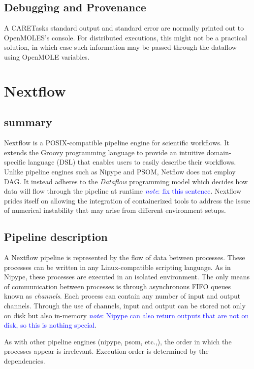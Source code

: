 \documentclass{report}
\newcommand{\note}[1]{\textcolor{blue}{\textit{note}: #1}}
\begin{document}
        \subsection{Debugging and Provenance} A CARETasks standard output and
        standard error are normally printed out to OpenMOLES's console. For
        distributed executions, this might not be a practical solution, in which
        case such information may be passed through the dataflow using OpenMOLE
        variables.
         
        \section{Nextflow} \subsection{summary} Nextflow is a POSIX-compatible
        pipeline engine for scientific workflows.  It extends the Groovy
        programming language to provide an  intuitive domain-specific language
        (DSL) that enables users to easily describe their workflows. Unlike
        pipeline engines such as Nipype and PSOM, Netflow does not employ DAG.
        It instead adheres to the \textit{Dataflow} programming model which
        decides how data will flow through the pipeline at runtime \note{fix
        this sentence}. Nextflow prides itself on allowing the integration of
        containerized tools to address the issue of numerical instability that
        may arise from different environment setups.
  
        \subsection{Pipeline description} A Nextflow pipeline is represented by
        the flow of data between processes. These processes can be written in
        any Linux-compatible scripting language. As in Nipype, these processes
        are executed in an isolated environment. The only means of communication
        between processes is through asynchronous FIFO queues known as
        \textit{channels}. Each process can contain any number of input and
        output channels. Through the use of channels, input and output can be
        stored not only on disk but also in-memory \note{Nipype can also return
        outputs that are not on disk, so this is nothing special}.  

        As with other pipeline engines (nipype, psom, etc.,), the order in which
        the processes appear is irrelevant. Execution order is determined by the
        dependencies.        
\end{document}
